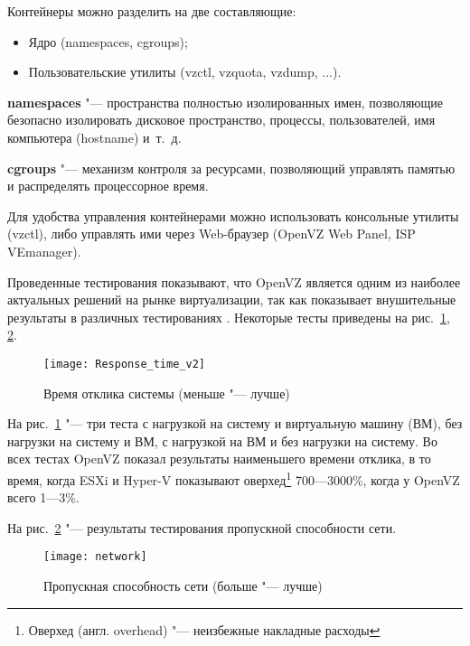 Контейнеры можно разделить на две составляющие:
\begin{itemize}
    \item Ядро (namespaces, cgroups);
    \item Пользовательские утилиты (vzctl, vzquota, vzdump, ...).
\end{itemize}
 
\textbf{namespaces} "--- пространства полностью изолированных имен, позволяющие безопасно изолировать дисковое пространство, процессы, пользователей, имя компьютера (hostname) и~т.~д.

\textbf{cgroups} "--- механизм контроля за ресурсами, позволяющий управлять памятью и распределять процессорное время.

Для удобства управления контейнерами можно использовать консольные утилиты (vzctl), либо управлять ими через Web-браузер (OpenVZ Web Panel, ISP VEmanager).

Проведенные тестирования показывают, что OpenVZ является одним из наиболее актуальных решений на рынке виртуализации, так как показывает внушительные результаты в различных тестированиях \cite{padala2007performance}.
Некоторые тесты \cite{openvzperformance} приведены на рис.~\ref{pic:openvz_test_1}, \ref{pic:openvz_test_2}.

\begin{figure}[ht]
    \centering
	\texttt{[image: Response\_time\_v2]}
	\caption{Время отклика системы (меньше "--- лучше)}\label{pic:openvz_test_1}
\end{figure}

На рис.~\ref{pic:openvz_test_1} "--- три теста с нагрузкой на систему и виртуальную машину (ВМ), без нагрузки на систему и ВМ, с нагрузкой на ВМ и без нагрузки на систему.
Во всех тестах OpenVZ показал результаты наименьшего времени отклика, в то время, когда ESXi и Hyper-V показывают оверхед\footnote{Оверхед (англ. overhead) "--- неизбежные накладные расходы} 700---3000\%, когда у OpenVZ всего 1---3\%.

На рис.~\ref{pic:openvz_test_2} "--- результаты тестирования пропускной способности сети.

\begin{figure}[ht]
    \centering
	\texttt{[image: network]}
	\caption{Пропускная способность сети (больше "--- лучше)}\label{pic:openvz_test_2}
\end{figure}

\clearpage
